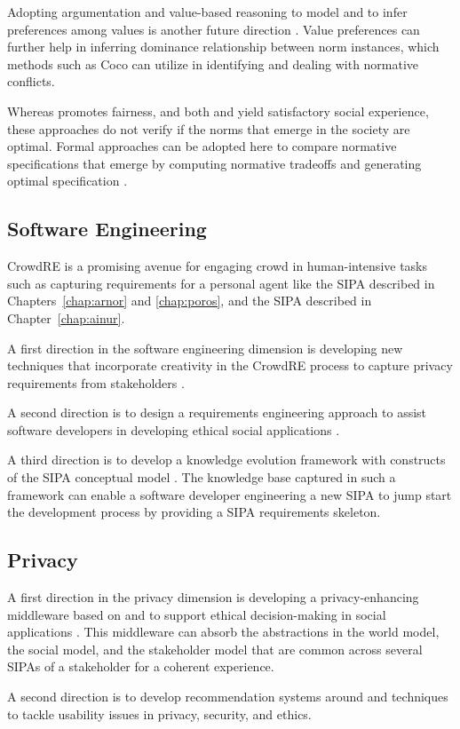 Adopting argumentation and value-based reasoning to model and to infer preferences among values is another future direction \citep{Ajmeri-IJCAI16-Coco,Ajmeri-Computer17-Aragorn}.
Value preferences can further help in inferring dominance relationship between norm instances, which methods such as Coco \citep{IJCAI-16:Coco}
can utilize in identifying and dealing with normative conflicts. 

Whereas \frameworkAinur promotes fairness, and both \frameworkB and \frameworkAinur yield satisfactory social experience, these approaches do not verify if the norms that emerge in the society are optimal. 
Formal approaches can be adopted here to compare normative specifications that emerge by computing normative tradeoffs and generating optimal specification \citep{AAAI-17:Kont,Kafali-IS16-Revani}. 

\subsection{Software Engineering}
CrowdRE is a promising avenue for engaging crowd in human-intensive tasks such as capturing requirements for a personal agent like the \ringer SIPA described in Chapters~\ref{chap:arnor} and \ref{chap:poros}, and the \locationapp SIPA described in Chapter~\ref{chap:ainur}. 

A first direction in the software engineering dimension is developing new techniques that incorporate creativity in the CrowdRE process to capture privacy requirements from stakeholders \citep{Murukannaiah-RE16-Creative,Dhinakaran-RE18-ActiveAppReview}. 

A second direction is to design a requirements engineering approach to assist software developers in developing ethical social applications \citep{Ajmeri-AAMAS17-Arnor,Ajmeri-IC18-Ethical}. 

A third direction is to develop a knowledge evolution framework with constructs of the SIPA conceptual model \citep{Ghaisas-2013-KRE}. The knowledge base captured in such a framework can enable a software developer engineering a new SIPA to jump start the development process by providing a SIPA requirements skeleton. 

\subsection{Privacy}

A first direction in the privacy dimension is developing a privacy-enhancing middleware based on \frameworkB and \frameworkAinur to support ethical decision-making in social applications \citep{Ajmeri-HotSoS18-Ethics,Murukannaiah-TOSEM15-Platys}. 
This middleware can absorb the abstractions in the world model, the social model, and the stakeholder model that are common across several SIPAs of a stakeholder for a coherent experience. 

A second direction is to develop recommendation systems around \frameworkB and \frameworkAinur techniques to tackle usability issues in privacy, security, and ethics.
